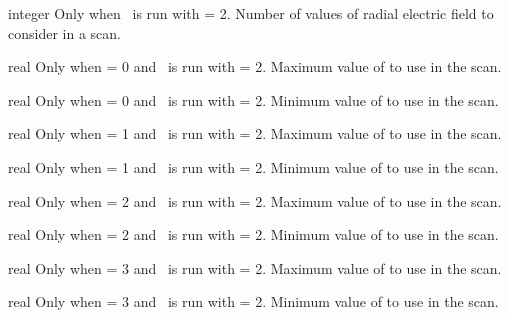 \myhrule

{integer}
{Only when \sfincsScan~is run with  = 2.}
{Number of values of radial electric field to consider in a scan.}

\myhrule

{real}
{Only when  = 0 and \sfincsScan~is run with  = 2.}
{Maximum value of  to use in the scan.}

\myhrule

{real}
{Only when  = 0 and \sfincsScan~is run with  = 2.}
{Minimum value of  to use in the scan.}

\myhrule

{real}
{Only when  = 1 and \sfincsScan~is run with  = 2.}
{Maximum value of  to use in the scan.}

\myhrule

{real}
{Only when  = 1 and \sfincsScan~is run with  = 2.}
{Minimum value of  to use in the scan.}

\myhrule

{real}
{Only when  = 2 and \sfincsScan~is run with  = 2.}
{Maximum value of  to use in the scan.}

\myhrule

{real}
{Only when  = 2 and \sfincsScan~is run with  = 2.}
{Minimum value of  to use in the scan.}

\myhrule

{real}
{Only when  = 3 and \sfincsScan~is run with  = 2.}
{Maximum value of  to use in the scan.}

\myhrule

{real}
{Only when  = 3 and \sfincsScan~is run with  = 2.}
{Minimum value of  to use in the scan.}

